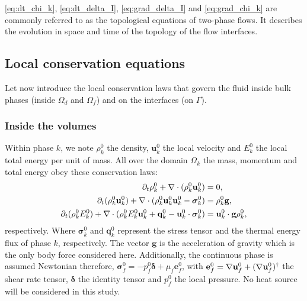 \ref{eq:dt_chi_k}, \ref{eq:dt_delta_I}, \ref{eq:grad_delta_I} and \ref{eq:grad_chi_k} are commonly referred to as the topological equations of two-phase flows.
It describes the evolution in space and time of the topology of the flow interfaces.

\subsection{Local conservation equations}
\label{sec:local_eq}
Let now introduce the local conservation laws that govern the fluid inside bulk phases (inside $\Omega_d$ and $\Omega_f$) and on the interfaces (on $\Gamma$). 

\subsubsection{Inside the volumes}

Within phase $k$, we note $\rho_k^0$ the density, $\textbf{u}_k^0$ the local velocity and $E_k^0$ the local total energy per unit of mass.
All over the domain $\Omega_k$ the mass, momentum and total energy obey these conservation laws:
\begin{align}
    \label{eq:dt_rho}
    \partial_t \rho_k^0  
    + \mathbf{\nabla}\cdot (
        \rho_k^0\textbf{u}_k^0
    )
    &= 
    0,\\
    \label{eq:dt_rhou_k}
    \partial_t (\rho_k^0\textbf{u}_k^0)  
    + \mathbf{\nabla}\cdot (
        \rho_k^0\textbf{u}_k^0\textbf{u}_k^0
        - \bm{\sigma}_k^0 
    )
    &= 
    \rho_k^0 \textbf{g},\\
    \label{eq:dt_rhoE_k}
    \partial_t (\rho_k^0E_k^0)  
    + \mathbf{\nabla}\cdot (
        \rho_k^0E_k^0\textbf{u}_k^0
        + \textbf{q}_k^0
        - \textbf{u}_k^0 \cdot \bm{\sigma}_k^0 
        )
    &= 
    \textbf{u}_k^0 \cdot \textbf{g}  \rho_k^0, 
\end{align} 
respectively. 
Where $\bm\sigma_k^0$ and $\textbf{q}_k^0$ represent the stress tensor and the thermal energy flux of phase $k$, respectively. 
The vector $\textbf{g}$ is the acceleration of gravity which is the only body force considered here.
Additionally, the continuous phase is assumed Newtonian therefore, $\bm{\sigma}_f^0 = - p_f^0 \bm\delta + \mu_f \textbf{e}_f^0$, with $\textbf{e}_f^0 = \mathbf{\nabla} \textbf{u}_f^0+(\mathbf{\nabla} \textbf{u}_f^0)^\dagger$ the shear rate tensor, $\bm\delta$ the identity tensor and $p_f ^0$ the local pressure. 
No heat source will be considered in this study.

